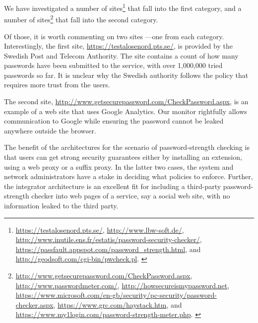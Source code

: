 \documentclass{llncs}
\begin{document}
We have investigated a number of sites\footnote{\scriptsize{
\url{https://testalosenord.pts.se/},
\url{http://www.lbw-soft.de/},
\url{http://www.inutile.ens.fr/estatis/password-security-checker/},
\url{https://passfault.appspot.com/password_strength.html}, and
\url{http://geodsoft.com/cgi-bin/pwcheck.pl}.
}
}
that fall into the first category, and a number of sites\footnote{\scriptsize{
\url{http://www.getsecurepassword.com/CheckPassword.aspx},
\url{http://www.passwordmeter.com/},
\url{http://howsecureismypassword.net},
\url{https://www.microsoft.com/en-gb/security/pc-security/password-checker.aspx},
\url{https://www.grc.com/haystack.htm}, and
\url{https://www.my1login.com/password-strength-meter.php}.
}
}
that fall into the second category.

Of those, it is worth commenting on two sites ---one from each category.  Interestingly, the first
site, {\footnotesize{\url{https://testalosenord.pts.se/}}}, is provided by
the Swedish Post and Telecom Authority. The site contains a count of how many
passwords have been submitted to the service, with over 1,000,000 tried
passwords so far. It is unclear why the Swedish authority follows the policy
that requires more trust from the users.

The second
site, {\footnotesize{\url{http://www.getsecurepassword.com/CheckPassword.aspx}}}, is
an example of a web site that uses Google Analytics. Our monitor rightfully
allows communication to Google while ensuring the password cannot be leaked
anywhere outside the browser. 

The benefit of the architectures for the scenario of password-strength checking is
that users can get strong security guarantees either by installing an
extension, using a web proxy or a suffix proxy. In the latter two
cases, the system and network administrators have a stake in deciding
what policies to enforce. Further, the integrator architecture is an
excellent fit for including a third-party password-strength checker
into web pages of a service, say a social web site, with no
information leaked to the third party.
\end{document}
